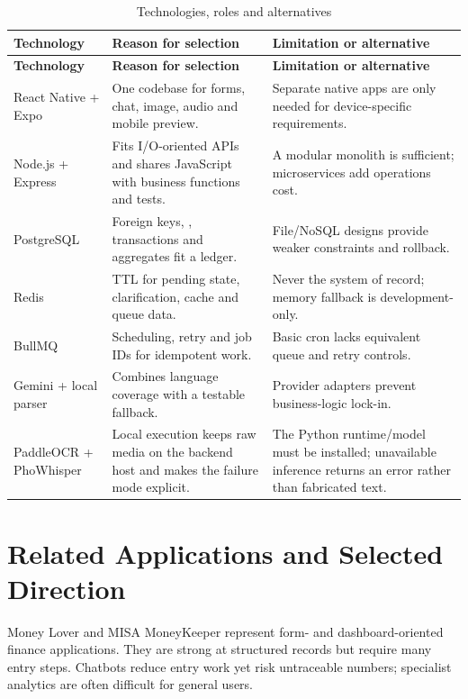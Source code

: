 \begin{longtable}{@{}L{3.0cm}L{5.6cm}L{5.3cm}@{}}
  \caption{Technologies, roles and alternatives}\label{tab:technology-rationale}\\
  \toprule
  \textbf{Technology} & \textbf{Reason for selection} & \textbf{Limitation or alternative} \\
  \midrule
  \endfirsthead
  \toprule
  \textbf{Technology} & \textbf{Reason for selection} & \textbf{Limitation or alternative} \\
  \midrule
  \endhead
  React Native + Expo & One codebase for forms, chat, image, audio and mobile preview. & Separate native apps are only needed for device-specific requirements. \\
  Node.js + Express & Fits I/O-oriented APIs and shares JavaScript with business functions and tests. & A modular monolith is sufficient; microservices add operations cost. \\
  PostgreSQL \cite{postgresql2026} & Foreign keys, , transactions and aggregates fit a ledger. & File/NoSQL designs provide weaker constraints and rollback. \\
  Redis \cite{redisexpire} & TTL for pending state, clarification, cache and queue data. & Never the system of record; memory fallback is development-only. \\
  BullMQ \cite{bullmq2026} & Scheduling, retry and job IDs for idempotent work. & Basic cron lacks equivalent queue and retry controls. \\
  Gemini + local parser & Combines language coverage with a testable fallback. & Provider adapters prevent business-logic lock-in. \\
  PaddleOCR + PhoWhisper & Local execution keeps raw media on the backend host and makes the failure mode explicit. & The Python runtime/model must be installed; unavailable inference returns an error rather than fabricated text. \\
  \bottomrule
\end{longtable}

\section{Related Applications and Selected Direction}

Money Lover \cite{moneylover} and MISA MoneyKeeper \cite{misamoneykeeper} represent form- and dashboard-oriented finance applications. They are strong at structured records but require many entry steps. Chatbots reduce entry work yet risk untraceable numbers; specialist analytics are often difficult for general users.

